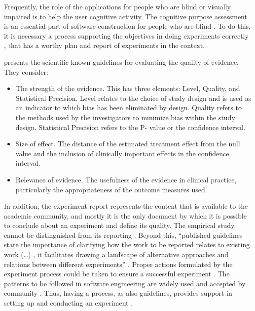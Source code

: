 
Frequently, the role of the applications for people who are blind or visually impaired is to help the user cognitive activity. The cognitive purpose assessment is an essential part of software construction for people who are blind \cite{DARIN2018}. To do this, it is necessary a process supporting the objectives in doing experiments correctly \cite{Wohlin2000}, that has a worthy plan and report of experiments in the context.

 presents the scientific known guidelines for evaluating the quality of evidence. They consider:
\begin{itemize}
    \item The strength of the evidence. This has three elements: Level, Quality, and Statistical Precision. Level relates to the choice of study design and is used as an indicator to which bias has been eliminated by design. Quality refers to the methods used by the investigators to minimize bias within the study design. Statistical Precision refers to the P- value or the confidence interval.
    \item Size of effect. The distance of the estimated treatment effect from the null value and the inclusion of clinically important effects in the confidence interval.
    \item Relevance of evidence. The usefulness of the evidence in clinical practice, particularly the appropriateness of the outcome measures used.
\end{itemize}

In addition, the experiment report represents the content that is available to the academic community, and mostly it is the only document by which it is possible to conclude about an experiment and define its quality. The empirical study cannot be distinguished from its reporting \cite{Wohlin2000}. Beyond this, ``published guidelines state the importance of clarifying how the work to be reported relates to existing work (\ldots) , it facilitates drawing a landscape of alternative approaches and relations between different experiments'' \cite{Jedlitschka2007}. Proper actions formulated by the experiment process could be taken to ensure a successful experiment \cite{Wohlin2000}. The patterns to be followed in software engineering are widely used and accepted by community \cite{Freeman2004HeadPatterns}. Thus, having a process, as also guidelines, provides support in setting up and conducting an experiment \cite{Wohlin2000}.


